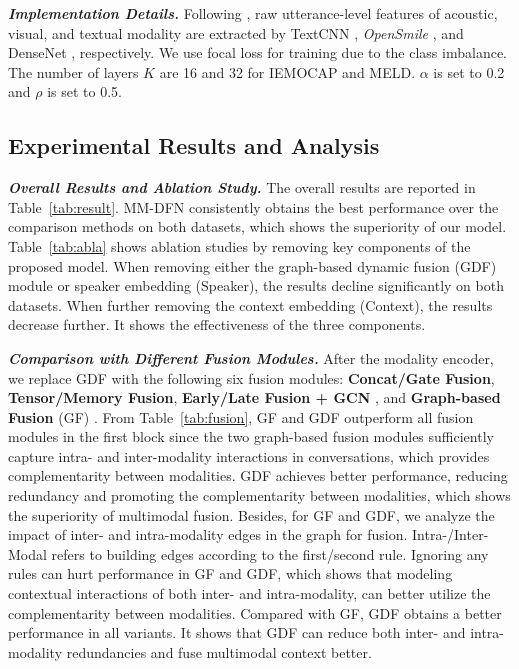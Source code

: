   

\textit{\textbf{Implementation Details.}}
Following \cite{DBLP:conf/acl/HuLZJ20}, raw utterance-level features of acoustic, visual, and textual modality are extracted by TextCNN \cite{DBLP:conf/emnlp/Kim14}, \textit{OpenSmile}  \cite{DBLP:journals/speech/SchullerBSS11}, and DenseNet \cite{DBLP:conf/cvpr/HuangLMW17}, respectively. %
We use focal loss \cite{lin2017focal} for training due to the class imbalance. %
The number of layers $K$ are 16 and 32 for IEMOCAP and MELD. 
$\alpha$ is set to 0.2 and $\rho$ is set to 0.5. 

\subsection{Experimental Results and Analysis}
\textit{\textbf{Overall Results and Ablation Study.}}
The overall results are reported in Table~\ref{tab:result}.
MM-DFN consistently obtains the best performance over the comparison methods on both datasets, which shows the superiority of our model.
Table~\ref{tab:abla} shows ablation studies by removing key components of the proposed model. %
When removing either the graph-based dynamic fusion (GDF) module or speaker embedding (Speaker), the results decline significantly on both datasets. 
When further removing the context embedding (Context), the results decrease further. 
It shows the effectiveness of the three components.

 \textit{\textbf{Comparison with Different Fusion Modules.}}
After the modality encoder, 
we replace GDF with the following six fusion modules:
\textbf{Concat/Gate Fusion}, %
\textbf{Tensor/Memory Fusion}\cite{DBLP:conf/acl/MorencyLZLSL18,DBLP:conf/aaai/ZadehLMPCM18},
\textbf{Early/Late Fusion + GCN }\cite{DBLP:conf/acl/HuLZJ20}, and  
\textbf{Graph-based Fusion} (GF)   \cite{DBLP:conf/acl/HuLZJ20}.
From Table~\ref{tab:fusion}, GF and GDF outperform all fusion modules in the first block since the two graph-based fusion modules sufficiently capture intra- and inter-modality interactions in conversations, which provides complementarity between modalities. 
GDF achieves better performance, reducing  redundancy  and  promoting the  complementarity  between  modalities, which shows the superiority of multimodal fusion. %
Besides, for GF and GDF, we analyze the impact of inter- and intra-modality edges in the graph for fusion.
{Intra-}/{Inter-Modal} refers to building edges according to the first/second rule.
Ignoring any rules can hurt performance in GF and GDF, which shows that modeling contextual interactions of both inter- and intra-modality, can better utilize the complementarity  between modalities.
Compared with GF, GDF obtains a better performance in all variants. %
It shows that GDF can reduce both inter- and intra-modality redundancies and fuse multimodal context better.

